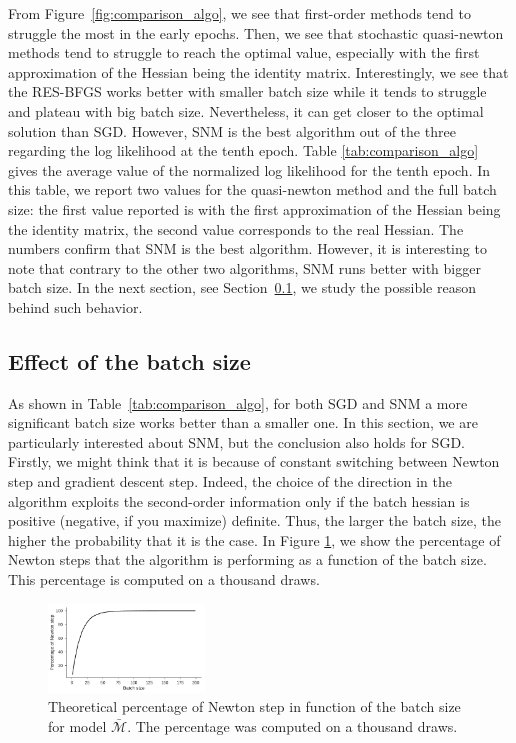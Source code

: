 \documentclass[conference]{IEEEtran}
\begin{document}
From Figure~\ref{fig:comparison_algo}, we see that first-order methods tend to struggle the most in the early epochs. Then, we see that stochastic quasi-newton methods tend to struggle to reach the optimal value, especially with the first approximation of the Hessian being the identity matrix. Interestingly, we see that the RES-BFGS works better with smaller batch size while it tends to struggle and plateau with big batch size. Nevertheless, it can get closer to the optimal solution than SGD. However, SNM is the best algorithm out of the three regarding the log likelihood at the tenth epoch. Table \ref{tab:comparison_algo} gives the average value of the normalized log likelihood for the tenth epoch. In this table, we report two values for the quasi-newton method and the full batch size: the first value reported is with the first approximation of the Hessian being the identity matrix, the second value corresponds to the real Hessian. The numbers confirm that SNM is the best algorithm. However, it is interesting to note that contrary to the other two algorithms, SNM runs better with bigger batch size. In the next section, see Section~\ref{sec:effect_bs}, we study the possible reason behind such behavior.

\subsection{Effect of the batch size}
\label{sec:effect_bs}

As shown in Table~\ref{tab:comparison_algo}, for both SGD and SNM a more significant batch size works better than a smaller one. In this section, we are particularly interested about SNM, but the conclusion also holds for SGD. Firstly, we might think that it is because of constant switching between Newton step and gradient descent step. Indeed, the choice of the direction in the algorithm exploits the second-order information only if the batch hessian is positive (negative, if you maximize) definite. Thus, the larger the batch size, the higher the probability that it is the case. In Figure \ref{fig:perc_newton}, we show the percentage of Newton steps that the algorithm is performing as a function of the batch size. This percentage is computed on a thousand draws. \\

\begin{figure}[t]
\centering
\includegraphics[width=0.37\textwidth]{../figures/perc_newton.pdf}
\vspace{-0.3cm}
\caption{Theoretical percentage of Newton step in function of the batch size for model $\bar{\mathcal{M}}$. The percentage was computed on a thousand draws.}
\label{fig:perc_newton}
\vspace{-0.3cm}
\end{figure}
\end{document}
